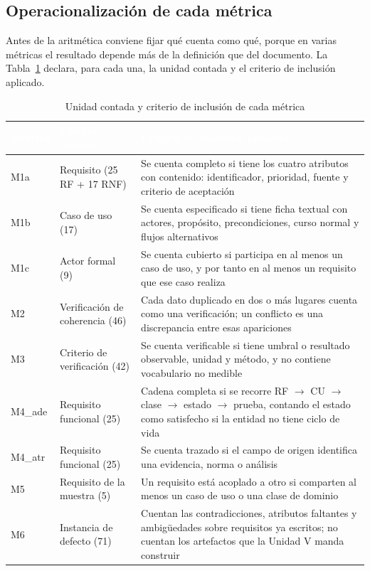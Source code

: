 \subsection{Operacionalizaci\'on de cada m\'etrica}

Antes de la aritm\'etica conviene fijar qu\'e cuenta como qu\'e, porque en varias m\'etricas el resultado depende m\'as de la definici\'on que del documento. La Tabla~\ref{tab:operacionalizacion} declara, para cada una, la unidad contada y el criterio de inclusi\'on aplicado.

\begin{table}[H]
\centering
\small
\begin{tabular}{|l|p{4.3cm}|p{6.6cm}|}
\hline
\cellcolor{sigagreen}\textcolor{white}{\textbf{M\'etrica}} & \cellcolor{sigagreen}\textcolor{white}{\textbf{Unidad contada}} & \cellcolor{sigagreen}\textcolor{white}{\textbf{Criterio de inclusi\'on aplicado}} \\ \hline
M1a & Requisito (25 RF + 17 RNF) & Se cuenta completo si tiene los cuatro atributos con contenido: identificador, prioridad, fuente y criterio de aceptaci\'on \\ \hline
M1b & Caso de uso (17) & Se cuenta especificado si tiene ficha textual con actores, prop\'osito, precondiciones, curso normal y flujos alternativos \\ \hline
M1c & Actor formal (9) & Se cuenta cubierto si participa en al menos un caso de uso, y por tanto en al menos un requisito que ese caso realiza \\ \hline
M2 & Verificaci\'on de coherencia (46) & Cada dato duplicado en dos o m\'as lugares cuenta como una verificaci\'on; un conflicto es una discrepancia entre esas apariciones \\ \hline
M3 & Criterio de verificaci\'on (42) & Se cuenta verificable si tiene umbral o resultado observable, unidad y m\'etodo, y no contiene vocabulario no medible \\ \hline
M4\_ade & Requisito funcional (25) & Cadena completa si se recorre RF $\rightarrow$ CU $\rightarrow$ clase $\rightarrow$ estado $\rightarrow$ prueba, contando el estado como satisfecho si la entidad no tiene ciclo de vida \\ \hline
M4\_atr & Requisito funcional (25) & Se cuenta trazado si el campo de origen identifica una evidencia, norma o an\'alisis \\ \hline
M5 & Requisito de la muestra (5) & Un requisito est\'a acoplado a otro si comparten al menos un caso de uso o una clase de dominio \\ \hline
M6 & Instancia de defecto (71) & Cuentan las contradicciones, atributos faltantes y ambig\"uedades sobre requisitos ya escritos; no cuentan los artefactos que la Unidad V manda construir \\ \hline
\end{tabular}
\caption{Unidad contada y criterio de inclusi\'on de cada m\'etrica}
\label{tab:operacionalizacion}
\end{table}

